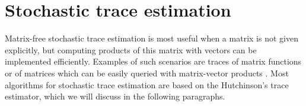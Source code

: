 
\section{Stochastic trace estimation}
\label{sec:2-chebyshev-stochastic-trace-estimation}

Matrix-free stochastic trace estimation is most useful when a matrix is not given
explicitly, but computing products of this matrix with vectors can be implemented
efficiently. Examples of such scenarios are traces of matrix functions
\cite{ubaru2017lanczos,epperly2023xtrace} or of matrices which can be easily
queried with matrix-vector products \cite{ghorbani2019investigation,adepu2021hessian}.
Most algorithms for stochastic trace estimation are based on the Hutchinson's
trace estimator, which we will discuss in the following paragraphs.\\

